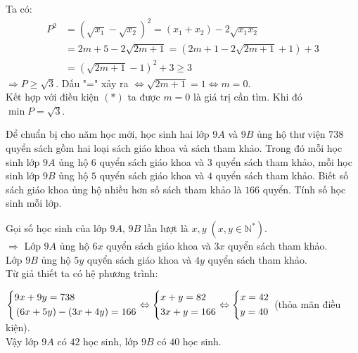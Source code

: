 \begin{ex}
{\begin{enumerate}
\begin{enumerate}
         Ta có: \begin{align*}
         P^2&=\left(\sqrt{x_1}-\sqrt{x_2}\right)^2=\left(x_1+x_2\right)-2\sqrt{x_1x_2}\\&=2m+5-2\sqrt{2m+1}=\left(2m+1-2\sqrt{2m+1}+1\right)+3\\&=\left(\sqrt{2m+1}-1\right)^2+3\ge 3
         \end{align*}
         $\Rightarrow P\ge \sqrt{3}$. Dấu "=" xảy ra $\Leftrightarrow \sqrt{2m+1}=1\Leftrightarrow m=0$.\\
         Kết hợp với điều kiện $(*)$ ta được $m=0$ là giá trị cần tìm. Khi đó $\min P=\sqrt{3}$.
        \end{enumerate}
    \end{enumerate}
    }
\end{ex}

\begin{ex}%
    \hfill\par
    Để chuẩn bị cho năm học mới, học sinh hai lớp $9A$ và $9B$ ủng hộ thư viện $738$ quyển sách gồm hai loại sách giáo khoa và sách tham khảo. Trong đó mỗi học sinh lớp $9A$ ủng hộ $6$ quyển sách giáo khoa và $3$ quyển sách tham khảo, mỗi học sinh lớp $9B$ ủng hộ $5$ quyển sách giáo khoa và $4$ quyển sách tham khảo. Biết số sách giáo khoa ủng hộ nhiều hơn số sách tham khảo là $166$ quyển. Tính số học sinh mỗi lớp.
\loigiai
    {
    Gọi số học sinh của lớp $9A$, $9B$ lần lượt là $x,y\;\left(x,y\in\mathbb{N^*}\right)$.\\
    $\Rightarrow $ Lớp $9A$ ủng hộ $6x$ quyển sách giáo khoa và $3x$ quyển sách tham khảo.\\
    Lớp $9B$ ủng hộ $5y$ quyển sách giáo khoa và $4y$ quyển sách tham khảo.\\
    Từ giả thiết ta có hệ phương trình:\par $\left\{\begin{aligned}&9x+9y=738\\&\left(6x+5y\right)-\left(3x+4y\right)=166\end{aligned}\right.\Leftrightarrow\left\{\begin{aligned}&x+y=82\\&3x+y=166\end{aligned}\right.\Leftrightarrow \left\{\begin{aligned}&x=42\\&y=40\end{aligned}\right.$ (thỏa mãn điều kiện).\\
    Vậy lớp $9A$ có $42$ học sinh, lớp $9B$ có $40$ học sinh.
    }
\end{ex}


